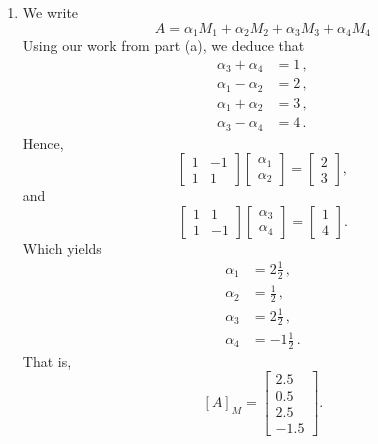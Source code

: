 \documentclass[letterpaper]{article}
\begin{document}
\begin{enumerate}
and
$$\left[\begin{array}{cc}1&1\\1&-1\end{array}\right] \begin{bmatrix} \alpha_3\\\alpha_4 \end{bmatrix} = \begin{bmatrix} 0\\0 \end{bmatrix}.$$
Because both matrices are non-singular, we deduce that the \underline{only} solution is $\alpha_1=\alpha_2=\alpha_3=\alpha_4=0$, and thus the set is linearly independent.

\item We write
$$A=\alpha_1 M_1+\alpha_2 M_2 +\alpha_3 M_3+\alpha_4 M_4 $$
Using our work from part (a), we deduce that
$$\begin{aligned} \alpha_3+\alpha_4&=1\,,\\ \alpha_1-\alpha_2&=2\,,\\ \alpha_1+\alpha_2&=3\,,\\ \alpha_3-\alpha_4&=4\,. \end{aligned}$$
Hence,
$$\left[\begin{array}{cc}1&-1\\1&1\end{array}\right] \begin{bmatrix} \alpha_1\\\alpha_2 \end{bmatrix} = \begin{bmatrix} 2\\3 \end{bmatrix},$$
and
$$\left[\begin{array}{cc}1&1\\1&-1\end{array}\right] \begin{bmatrix} \alpha_3\\\alpha_4 \end{bmatrix} = \begin{bmatrix} 1\\4 \end{bmatrix}.$$
Which yields
$$\begin{aligned}\alpha_1&=2\frac{1}{2}\,,\\\alpha_2&=\frac{1}{2}\,,\\\alpha_3&=2\frac{1}{2}\,,\\\alpha_4&=-1\frac{1}{2}\,.\end{aligned}$$
That is,
$$[A]_M = \begin{bmatrix} 2.5\\0.5\\2.5\\-1.5 \end{bmatrix}.$$

\end{enumerate}
\end{document}
